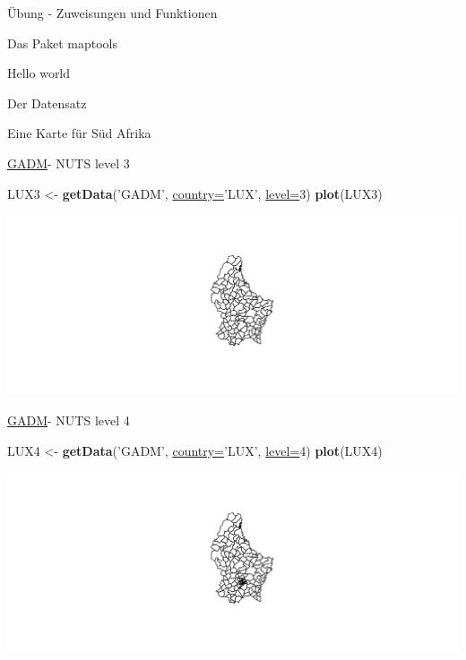 \documentclass[ignorenonframetext,]{beamer}
\newenvironment{Shaded}{\begin{snugshade}}{\end{snugshade}}
\newcommand{\DataTypeTok}[1]{\textcolor[rgb]{0.74,0.68,0.62}{\underline{#1}}}
\newcommand{\DecValTok}[1]{\textcolor[rgb]{0.27,0.67,0.26}{#1}}
\newcommand{\KeywordTok}[1]{\textcolor[rgb]{0.26,0.66,0.93}{\textbf{#1}}}
\newcommand{\NormalTok}[1]{\textcolor[rgb]{0.74,0.68,0.62}{#1}}
\newcommand{\StringTok}[1]{\textcolor[rgb]{0.02,0.61,0.04}{#1}}
\begin{document}
\begin{frame}[fragile]{Übung - Zuweisungen und Funktionen}
\begin{frame}[fragile]{Das Paket maptools}
\begin{frame}[fragile]{Hello world}
\begin{frame}[fragile]{Der Datensatz}
\begin{frame}[fragile]{Eine Karte für Süd Afrika}
\begin{frame}[fragile]{\href{http://www.gadm.org/}{GADM}- NUTS level 3}
\begin{Shaded}
\begin{Highlighting}[]
\NormalTok{LUX3 <-}\StringTok{ }\KeywordTok{getData}\NormalTok{(}\StringTok{'GADM'}\NormalTok{, }\DataTypeTok{country=}\StringTok{'LUX'}\NormalTok{, }\DataTypeTok{level=}\DecValTok{3}\NormalTok{)}
\KeywordTok{plot}\NormalTok{(LUX3)}
\end{Highlighting}
\end{Shaded}

\includegraphics{Geomedizin_files/figure-beamer/LUX3-1.pdf}

\end{frame}

\begin{frame}[fragile]{\href{http://www.gadm.org/}{GADM}- NUTS level 4}
\protect\hypertarget{gadm--nuts-level-4}{}

\begin{Shaded}
\begin{Highlighting}[]
\NormalTok{LUX4 <-}\StringTok{ }\KeywordTok{getData}\NormalTok{(}\StringTok{'GADM'}\NormalTok{, }\DataTypeTok{country=}\StringTok{'LUX'}\NormalTok{, }\DataTypeTok{level=}\DecValTok{4}\NormalTok{)}
\KeywordTok{plot}\NormalTok{(LUX4)}
\end{Highlighting}
\end{Shaded}

\includegraphics{Geomedizin_files/figure-beamer/LUX4-1.pdf}

\end{frame}


\end{frame}
\end{frame}
\end{frame}
\end{frame}
\end{frame}
\end{document}
